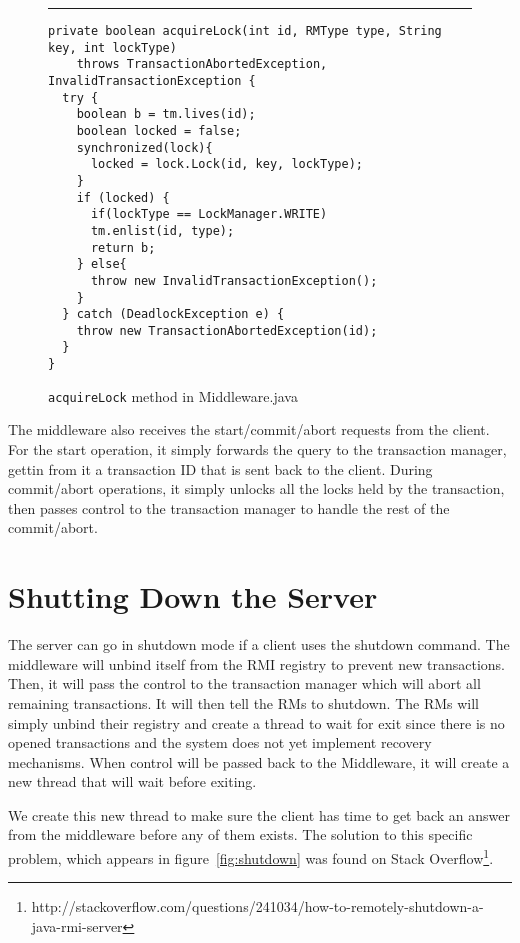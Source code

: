 \documentclass[12pt]{article}
\theoremstyle{plain}%
\theoremstyle{definition}
\theoremstyle{remark}
\newcommand{\java}[1]{{\lstinline!#1!}}
\newenvironment{figureone}[1]{%
  \def\deffigurecaption{#1}%
  \begin{figure}[htbp]%
  \begin{center}%
  \begin{minipage}{\columnwidth}%
  \hrule \vspace*{2ex}%
}{%
  \end{minipage}%
  \end{center}%
  \caption{\deffigurecaption}%
  \end{figure}%
}
\begin{document}
\begin{figureone}{\java{acquireLock} method in Middleware.java \label{fig:acquireLock}}
\begin{lstlisting}
private boolean acquireLock(int id, RMType type, String key, int lockType) 
    throws TransactionAbortedException, InvalidTransactionException {
  try {
    boolean b = tm.lives(id);
    boolean locked = false;
    synchronized(lock){
      locked = lock.Lock(id, key, lockType);
    }
    if (locked) {
      if(lockType == LockManager.WRITE)
      tm.enlist(id, type);
      return b;
    } else{
      throw new InvalidTransactionException();
    }
  } catch (DeadlockException e) {
    throw new TransactionAbortedException(id);
  }
}
\end{lstlisting}
\end{figureone}

The middleware also receives the start/commit/abort requests from the client. For the start operation, it simply forwards the query to the transaction manager, gettin from it a transaction ID that is sent back to the client. During commit/abort operations, it simply unlocks all the locks held by the transaction, then passes control to the transaction manager to handle the rest of the commit/abort.

\section{Shutting Down the Server}

The server can go in shutdown mode if a client uses the shutdown command. The middleware will unbind itself from the RMI registry to prevent new transactions. Then, it will pass the control to the transaction manager which will abort all remaining transactions. It will then tell the RMs to shutdown. The RMs will simply unbind their registry and create a thread to wait for exit since there is no opened transactions and the system does not yet implement recovery mechanisms. When control will be passed back to the Middleware, it will create a new thread that will wait before exiting.

We create this new thread to make sure the client has time to get back an answer from the middleware before any of them exists. The solution to this specific problem, which appears in figure~\ref{fig:shutdown} was found on Stack Overflow\footnote{http://stackoverflow.com/questions/241034/how-to-remotely-shutdown-a-java-rmi-server}.
\end{document}
